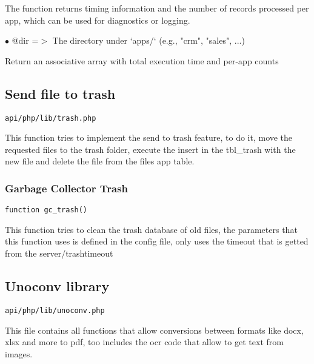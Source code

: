 \documentclass[a4paper]{article}
\begin{document}
The function returns timing information and the number of records processed
per app, which can be used for diagnostics or logging.

\begin{compactitem}
\item[\color{myblue}$\bullet$] @dir =$>$ The directory under `apps/` (e.g., "crm", "sales", ...)
\end{compactitem}

Return an associative array with total execution time and per-app counts

\hypertarget{toc530}{}
\subsection{Send file to trash}

\begin{lstlisting}
api/php/lib/trash.php
\end{lstlisting}

This function tries to implement the send to trash feature, to do it, move the
requested files to the trash folder, execute the insert in the tbl\_trash with
the new file and delete the file from the files app table.

\hypertarget{toc531}{}
\subsubsection{Garbage Collector Trash}

\begin{lstlisting}
function gc_trash()
\end{lstlisting}

This function tries to clean the trash database of old files, the parameters
that this function uses is defined in the config file, only uses the timeout
that is getted from the server/trashtimeout

\hypertarget{toc532}{}
\subsection{Unoconv library}

\begin{lstlisting}
api/php/lib/unoconv.php
\end{lstlisting}

This file contains all functions that allow conversions between formats like
docx, xlsx and more to pdf, too includes the ocr code that allow to get text
from images.

\hypertarget{toc533}{}
\end{document}
